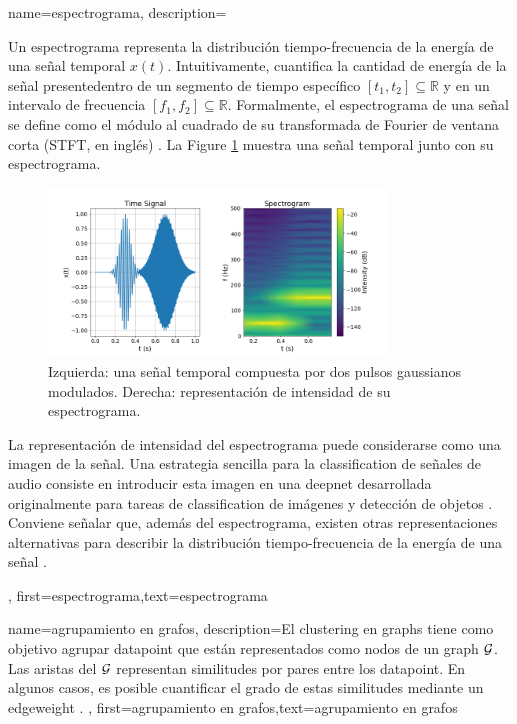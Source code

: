 {name={espectrograma},
	description={
		Un espectrograma representa la distribución tiempo-frecuencia de la energía de una señal temporal $x(t)$.  
		Intuitivamente, cuantifica la cantidad de energía de la señal presentedentro de un segmento de tiempo específico 
		$[t_{1},t_{2}] \subseteq \mathbb{R}$ y en un intervalo de frecuencia $[f_{1},f_{2}]\subseteq \mathbb{R}$. 
		Formalmente, el espectrograma de una señal se define como el módulo al cuadrado de su transformada
		de Fourier de ventana corta (STFT, en inglés) \cite{cohen1995time}.
        La Figure \ref{fig:spectrogram_dict} muestra una señal temporal junto con su espectrograma. 
	\begin{figure}[H]
		\centering
		\includegraphics[width=0.8\textwidth]{../../assets/spectrogram.png}
		\caption{Izquierda: una señal temporal compuesta por dos pulsos gaussianos modulados. Derecha: representación de intensidad de su espectrograma.
		\label{fig:spectrogram_dict}}
	\end{figure}
		La representación de intensidad del espectrograma puede considerarse como una imagen de la señal. 
		Una estrategia sencilla para la \gls{classification} de señales de audio consiste en introducir esta imagen en una 
		\gls{deepnet} desarrollada originalmente para tareas de \gls{classification} de imágenes y detección de objetos \cite{Li:2022aa}. 
		Conviene señalar que, además del espectrograma, existen otras representaciones alternativas para describir la distribución 
		tiempo-frecuencia de la energía de una señal \cite{TimeFrequencyAnalysisBoashash,MallatBook}. 
		}, 
	first={espectrograma},text={espectrograma} 
}

{name={agrupamiento en grafos},
	description={El \gls{clustering} en \gls{graph}s tiene como objetivo agrupar \gls{datapoint} que están representados como nodos de un \gls{graph} $\mathcal{G}$.
		Las aristas del $\mathcal{G}$ representan similitudes por pares entre los \gls{datapoint}. 
		En algunos casos, es posible cuantificar el grado de estas similitudes mediante un \gls{edgeweight} \cite{Luxburg2007,FlowSpecClustering2021}. 
		}, 
	first={agrupamiento en grafos},text={agrupamiento en grafos} 
}

